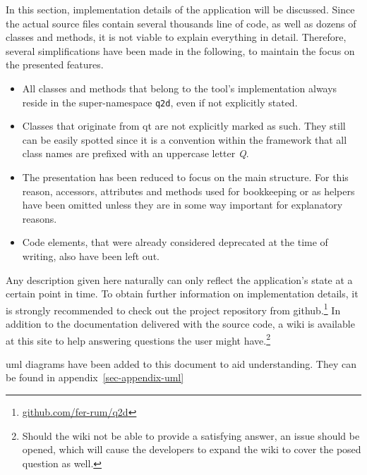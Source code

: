 In this section, implementation details of the application will be discussed.
Since the actual source files contain several thousands line of code, as well as dozens of classes and methods, it is not viable to explain everything in detail.
Therefore, several simplifications have been made in the following, to maintain the focus on the presented features.

\begin{itemize}
	\item All classes and methods that belong to the tool's implementation always reside in the super-namespace \texttt{q2d}, even if not explicitly stated.
	
	\item Classes that originate from \gls{qt} are not explicitly marked as such.
	They still can be easily spotted since it is a convention within the framework that all class names are prefixed with an uppercase letter \emph{Q}.
	\item The presentation has been reduced to focus on the main structure.
	For this reason, accessors, attributes and methods used for bookkeeping or as helpers have been omitted unless they are in some way important for explanatory reasons.
	
	\item Code elements, that were already considered deprecated at the time of writing, also have been left out.
\end{itemize}

Any description given here naturally can only reflect the application's state at a certain point in time.
To obtain further information on implementation details, it is strongly recommended to check out the project repository from \gls{github}.\footnote{
	\url{github.com/fer-rum/q2d}
}
In addition to the documentation delivered with the source code, a wiki is available at this site to help answering questions the user might have.\footnote{
	Should the wiki not be able to provide a satisfying answer, an issue should be opened, which will cause the developers to expand the wiki to cover the posed question as well. 
}

\Gls{uml} diagrams have been added to this document to aid understanding.
They can be found in appendix~\ref{sec-appendix-uml}